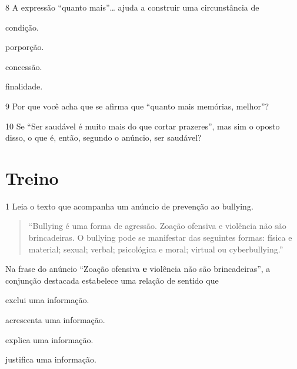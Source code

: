 \num{8} A expressão ``quanto mais''\ldots{} ajuda a construir uma
circunstância de

\begin{boxlist}
 condição.

 porporção.

 concessão.

 finalidade.
\end{boxlist}

\num{9} Por que você acha que se afirma que ``quanto mais memórias,
melhor''? 


\num{10} Se ``Ser saudável é muito mais do que cortar prazeres'', mas
sim o oposto disso, o que é, então, segundo o anúncio, ser saudável?


\section{Treino}

\num{1} Leia o texto que acompanha um anúncio de prevenção ao bullying.


\begin{quote}
``Bullying é uma forma de agressão. Zoação ofensiva e violência não são
brincadeiras. O bullying pode se manifestar das seguintes formas: física
e material; sexual; verbal; psicológica e moral; virtual ou
cyberbullying.''
\end{quote}

Na frase do anúncio ``Zoação ofensiva \textbf{e} violência não são
brincadeiras'', a conjunção destacada estabelece uma relação de sentido
que

\begin{escolha}
\item exclui uma informação.

\item acrescenta uma informação.

\item explica uma informação.

\item justifica uma informação.

\end{escolha}

